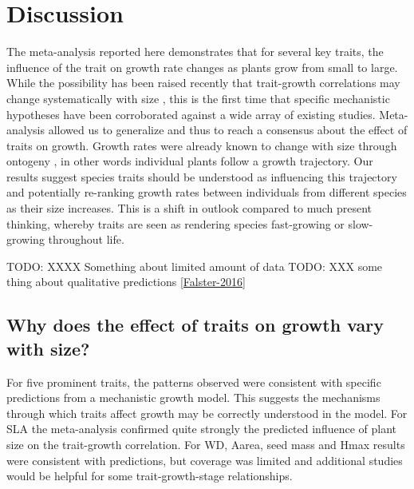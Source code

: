 \documentclass[a4paper,11pt]{article}
\begin{document}
\section*{Discussion}\label{discussion}

The meta-analysis reported here demonstrates that for several key traits, the influence of the trait on growth rate changes as plants grow from small to large. While the possibility has been raised recently that trait-growth correlations may change systematically with size \citep{Falster:2011ii, Ruger:2012jv, Iida:2014ep, Iida:2014hq}, this is the first time that specific mechanistic hypotheses have been corroborated against a wide array of existing studies. Meta-analysis allowed us to generalize and thus to reach a consensus about the effect of traits on growth. Growth rates were already known to change with size through ontogeny \citep{Condit:1993hd, Clark:1999ed, Herault:2011dd}, in other words individual plants follow a growth trajectory. Our results suggest species traits should be understood as influencing this trajectory and potentially re-ranking growth rates between individuals from different species as their size increases. This is a shift in outlook compared to much present thinking, whereby traits are seen as rendering species fast-growing or slow-growing throughout life.

TODO: XXXX Something about limited amount of data
TODO: XXX some thing about qualitative predictions \ref{Falster-2016}

\subsection*{Why does the effect of traits on growth vary with size?}

For five prominent traits, the patterns observed were consistent with specific predictions from a mechanistic growth model. This suggests the mechanisms through which traits affect growth may be correctly understood in the model. For SLA the meta-analysis confirmed quite strongly the predicted influence of plant size on the trait-growth correlation. For WD, Aarea, seed mass and Hmax results were consistent with predictions, but coverage was limited and additional studies would be helpful for some trait-growth-stage relationships.
\end{document}
